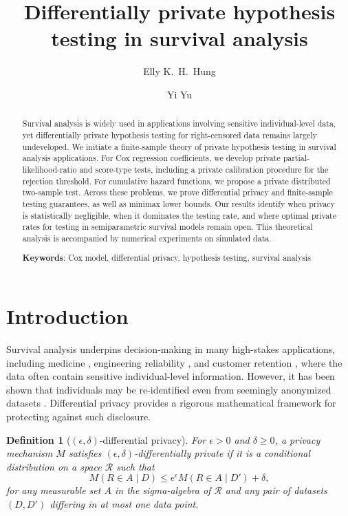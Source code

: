 \documentclass[11pt]{article}
\title{Differentially private hypothesis testing in survival analysis}
\author{Elly K.~H.~Hung}
\author{Yi Yu}
\affil{Department of Statistics, University of Warwick}
\date{}
\newtheorem{definition}{Definition}
\begin{document}
\maketitle

\begin{abstract}
Survival analysis is widely used in applications involving sensitive individual-level data, yet differentially private hypothesis testing for right-censored data remains largely undeveloped. We initiate a finite-sample theory of private hypothesis testing in survival analysis applications. For Cox regression coefficients, we develop private partial-likelihood-ratio and score-type tests, including a private calibration procedure for the rejection threshold. For cumulative hazard functions, we propose a private distributed two-sample test. Across these problems, we prove differential privacy and finite-sample testing guarantees, as well as minimax lower bounds. Our results identify when privacy is statistically negligible, when it dominates the testing rate, and where optimal private rates for testing in semiparametric survival models remain open. This theoretical analysis is accompanied by numerical experiments on simulated data. 

\vskip 0.5cm
\textbf{Keywords}: Cox model, differential privacy, hypothesis testing, survival analysis
\end{abstract}

\section{Introduction}
Survival analysis underpins decision-making in many high-stakes applications, including medicine \citep[e.g.][]{cox1972regression}, engineering reliability \citep[e.g.][]{meeker2021reliability}, and customer retention \citep[e.g.][]{fader2007project}, where the data often contain sensitive individual-level information. However, it has been shown that individuals may be re-identified even from seemingly anonymized datasets \citep[e.g.][]{narayanan2008deanonymization, rocher2019reidentification}. Differential privacy \citep{dwork2006} provides a rigorous mathematical framework for protecting against such disclosure.

\begin{definition}[$(\epsilon, \delta)$-differential privacy] \label{def-cdp} 
For $\epsilon > 0$ and $\delta \geq 0$, a privacy mechanism $M$ satisfies $(\epsilon, \delta)$-differentially private if it is a conditional distribution on a space $\mathcal{R}$ such that
\begin{equation*}
    M(R \in A \mid D) \leq e^\epsilon M(R \in A \mid D') + \delta,
\end{equation*}
for any measurable set $A$ in the sigma-algebra of $\mathcal{R}$ and any pair of datasets $(D, D')$ differing in at most one data point.
\end{definition}
\end{document}
